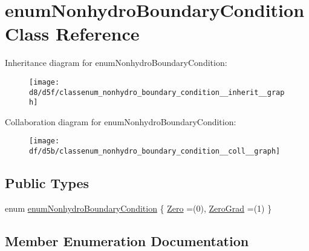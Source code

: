 \hypertarget{classenum_nonhydro_boundary_condition}{}\section{enum\+Nonhydro\+Boundary\+Condition Class Reference}
\label{classenum_nonhydro_boundary_condition}


Inheritance diagram for enum\+Nonhydro\+Boundary\+Condition\+:
\nopagebreak
\begin{figure}[H]
\begin{center}
\leavevmode
\texttt{[image: d8/d5f/classenum\_nonhydro\_boundary\_condition\_\_inherit\_\_graph]}
\end{center}
\end{figure}


Collaboration diagram for enum\+Nonhydro\+Boundary\+Condition\+:
\nopagebreak
\begin{figure}[H]
\begin{center}
\leavevmode
\texttt{[image: df/d5b/classenum\_nonhydro\_boundary\_condition\_\_coll\_\_graph]}
\end{center}
\end{figure}
\subsection*{Public Types}
\begin{DoxyCompactItemize}
\item 
enum \hyperlink{classenum_nonhydro_boundary_condition_a297c71bd7caa2c37cb7924ccc153b8ec}{enum\+Nonhydro\+Boundary\+Condition} \{ \hyperlink{classenum_nonhydro_boundary_condition_a297c71bd7caa2c37cb7924ccc153b8ecab9804d1913ba6c44f184375b3ed154ab}{Zero} =(0), 
\hyperlink{classenum_nonhydro_boundary_condition_a297c71bd7caa2c37cb7924ccc153b8eca2ee02cd409e578e65652c75364f4ffc1}{Zero\+Grad} =(1)
 \}
\end{DoxyCompactItemize}


\subsection{Member Enumeration Documentation}
\mbox{\label{classenum_nonhydro_boundary_condition_a297c71bd7caa2c37cb7924ccc153b8ec}} 

